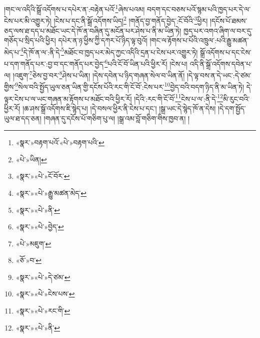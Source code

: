 །གང་ལ་འདིའི་སྒྲོ་འདོགས་པ་དཔེར་ན་:བརྟེན་པའོ་\footnote{«སྣར་»བརྟག་པའོ་«པེ་»བརྟག་པའི་}ཞེས་པའམ། བདག་དང་བཅས་པའོ་སྙམ་པའི་ཁྱད་པར་དེ་ལ་ངེས་པར་མི་འགྱུར་ཏེ། །ངེས་པ་དང་ནི་སྒྲོ་འདོགས་ཡིད།\footnote{«པེ་»ཡིན།} །གནོད་བྱ་གནོད་བྱེད་:ངོ་བོའི་\footnote{«སྣར་»«པེ་»ངོ་བོར་}ཕྱིར། །དངོས་པོ་ཐམས་ཅད་ལས་ཐ་དད་པ་མཐོང་ཡང་དེ་ཁོ་ན་བཞིན་དུ་མངོན་པར་ཤེས་པ་ནི་མ་ཡིན་ཏེ། ཁྱད་པར་འགའ་ཞིག་ལ་བར་དུ་གཅོད་པ་སྲིད་པའི་ཕྱིར། དཔེར་ན་ཉ་ཕྱིས་ཀྱི་དཀར་པོ་ཉིད་ལྟ་བུའོ། །གང་ལ་རྟོགས་པ་པོའི་འཁྲུལ་:པའི་རྒྱུ་མཚན་མེད་པ་\footnote{«སྣར་»«པེ་»རྒྱུ་མཚན་མེད་}དེ་ཁོ་ན་ལ་:ནི་དེ་\footnote{«སྣར་»«པེ་»ནི་}མཐོང་བ་ཁྱད་པར་མེད་ཀྱང་འདིའི་དྲན་པ་ངེས་པར་འགྱུར་ཏེ། སྒྲོ་འདོགས་པ་དང་ངེས་པ་དག་གནོད་པར་:བྱ་བ་དང་གནོད་པར་བྱེད་\footnote{«སྣར་»«པེ་»བྱེད་}པའི་ངོ་བོ་ཡིན་པའི་ཕྱིར་རོ། །ངེས་པ། འདི་ནི་སྒྲོ་འདོགས་དབེན་པ་ལ། །འཇུག་\footnote{«པེ་»མཇུག་}ཅེས་བྱ་བར་\footnote{«ཅོ་»བ་}ཤེས་པ་ཡིན། །དེས་དབེན་པ་ཉིད་གཞན་སེལ་བ་ཡིན་ནོ། །དེ་ལྟ་བས་ན་དེ་ཡང་:དེ་ཙམ་གྱིས་\footnote{«སྣར་»«པེ་»དེ་ཙམ་}སེལ་བའི་སྤྱོད་ཡུལ་ཅན་ཡིན་གྱི་དངོས་པོའི་རང་གི་ངོ་བོ་:ངེས་པར་\footnote{«སྣར་»«པེ་»ངེས་པས་}བྱེད་བའི་བདག་ཉིད་ནི་མ་ཡིན་ཏེ། དེ་ལྟར་ངེས་པ་ལ་ཡང་གཞན་མ་རྟོགས་པ་མཐོང་བའི་ཕྱིར་རོ། །དེའི་:རང་གི་ངོ་བོ་\footnote{«སྣར་»«པེ་»རང་གི་}ངེས་པ་ལ་:ནི་དེ་\footnote{«སྣར་»«པེ་»ནི་}མི་རུང་བའི་ཕྱིར་རོ། །ཆ་ཤས་སྒྲོ་འདོགས་ཇི་སྙེད་པ། །དེ་བསལ་ཕྱིར་ནི་ངེས་པ་དང་། །སྒྲ་ཡང་དེ་སྙེད་ཁོ་ན་དེས། །དེ་དག་སྤྱོད་ཡུལ་ཐ་དད་ཅན། །གཞན་དུ་དངོས་པོ་གཅིག་པུ་ལ། །སྒྲ་འམ་བློ་གཅིག་གིས་ཁྱབ་ན། །
